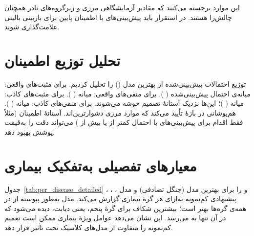 این موارد برجسته می‌کنند که مقادیر آزمایشگاهی مرزی و زیرگروه‌های نادر همچنان چالش‌زا هستند. در استقرار باید پیش‌بینی‌های با اطمینان پایین برای بازبینی بالینی علامت‌گذاری شوند.

\section{تحلیل توزیع اطمینان}

توزیع احتمالات پیش‌بینی‌شده از بهترین مدل () را تحلیل کردیم. برای مثبت‌های واقعی: میانه‌ی احتمال پیش‌بینی‌شده  ( ). برای منفی‌های واقعی: میانه  ( ). برای مثبت‌های کاذب: میانه  ( )؛ این‌ها نزدیک آستانۀ تصمیم خوشه می‌شوند. برای منفی‌های کاذب: میانه  ( ). هم‌پوشانی در بازۀ  تأیید می‌کند که موارد مرزی دشوارترین‌اند. آستانۀ اطمینان (مثلاً فقط اقدام برای پیش‌بینی‌های با احتمال کمتر از  یا بیش از ) می‌تواند دقت را به‌قیمت پوشش بهبود دهد.

\section{معیارهای تفصیلی به‌تفکیک بیماری}

جدول~\ref{tab:per_disease_detailed} ، ، ، و  را برای بهترین مدل (جنگل تصادفی) و مدل پیشنهادی کم‌نمونه به‌ازای هر گرۀ بیماری گزارش می‌کند. مدل  به‌طور پیوسته از  در همه‌ی گره‌ها بهتر است؛ بیشترین شکاف برای گرۀ پنجم، یعنی دیابت، دیده می‌شود که  در آن تنها به   می‌رسد. این نشان می‌دهد عوامل ویژۀ بیماری ممکن است تعمیم کم‌نمونه را متفاوت از مدل‌های کلاسیک تحت تأثیر قرار دهد.

